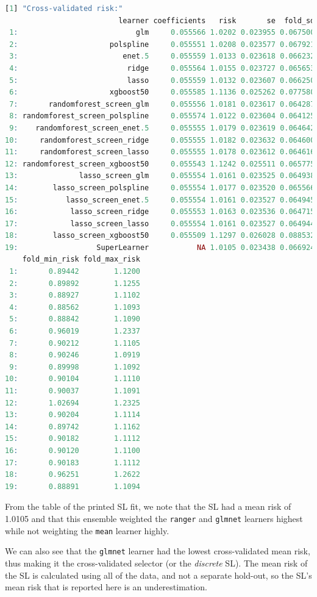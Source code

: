 \documentclass[12pt, krantz2,]{krantz}
\newcommand{\passthrough}[1]{#1}
\theoremstyle{definition}
\theoremstyle{definition}
\theoremstyle{definition}
\newcommand{\1}{\mathbbm{1}}
\begin{document}
\begin{lstlisting}[language=R]
[1] "Cross-validated risk:"
                          learner coefficients   risk       se  fold_sd
 1:                           glm     0.055566 1.0202 0.023955 0.067500
 2:                     polspline     0.055551 1.0208 0.023577 0.067921
 3:                        enet.5     0.055559 1.0133 0.023618 0.066232
 4:                         ridge     0.055564 1.0155 0.023727 0.065653
 5:                         lasso     0.055559 1.0132 0.023607 0.066250
 6:                     xgboost50     0.055585 1.1136 0.025262 0.077580
 7:       randomforest_screen_glm     0.055556 1.0181 0.023617 0.064287
 8: randomforest_screen_polspline     0.055574 1.0122 0.023604 0.064125
 9:    randomforest_screen_enet.5     0.055555 1.0179 0.023619 0.064642
10:     randomforest_screen_ridge     0.055555 1.0182 0.023632 0.064600
11:     randomforest_screen_lasso     0.055555 1.0178 0.023612 0.064616
12: randomforest_screen_xgboost50     0.055543 1.1242 0.025511 0.065775
13:              lasso_screen_glm     0.055554 1.0161 0.023525 0.064938
14:        lasso_screen_polspline     0.055554 1.0177 0.023520 0.065566
15:           lasso_screen_enet.5     0.055554 1.0161 0.023527 0.064945
16:            lasso_screen_ridge     0.055553 1.0163 0.023536 0.064715
17:            lasso_screen_lasso     0.055554 1.0161 0.023527 0.064944
18:        lasso_screen_xgboost50     0.055509 1.1297 0.026028 0.088532
19:                  SuperLearner           NA 1.0105 0.023438 0.066924
    fold_min_risk fold_max_risk
 1:       0.89442        1.1200
 2:       0.89892        1.1255
 3:       0.88927        1.1102
 4:       0.88562        1.1093
 5:       0.88842        1.1090
 6:       0.96019        1.2337
 7:       0.90212        1.1105
 8:       0.90246        1.0919
 9:       0.89998        1.1092
10:       0.90104        1.1110
11:       0.90037        1.1091
12:       1.02694        1.2325
13:       0.90204        1.1114
14:       0.89742        1.1162
15:       0.90182        1.1112
16:       0.90120        1.1100
17:       0.90183        1.1112
18:       0.96251        1.2622
19:       0.88891        1.1094
\end{lstlisting}

From the table of the printed SL fit, we note that the SL had a mean risk of
1.0105 and that
this ensemble weighted the \passthrough{\lstinline!ranger!} and \passthrough{\lstinline!glmnet!} learners highest while not
weighting the \passthrough{\lstinline!mean!} learner highly.

We can also see that the \passthrough{\lstinline!glmnet!} learner had the lowest cross-validated mean
risk, thus making it the cross-validated selector (or the \emph{discrete} SL). The
mean risk of the SL is calculated using all of the data, and not a separate
hold-out, so the SL's mean risk that is reported here is an underestimation.
\end{document}
